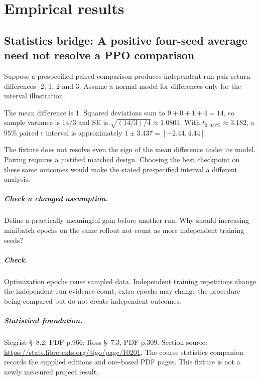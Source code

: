 \documentclass[11pt,oneside]{scrbook}
\begin{document}
\chapter{Empirical results}

\section{Statistics bridge: A positive four-seed average need not resolve a PPO comparison}
\begin{example}
Suppose a prespecified paired comparison produces independent run-pair return differences -2, 1, 2 and 3. Assume a normal model for differences only for the interval illustration.

The mean difference is 1. Squared deviations sum to $9+0+1+4=14$, so sample variance is $14/3$ and SE is $\sqrt{(14/3)/4}\approx1.0801$. With $t_{3,0.975}\approx3.182$, a 95\% paired t interval is approximately $1\pm3.437=[-2.44,4.44]$.
\end{example}
The fixture does not resolve even the sign of the mean difference under its model. Pairing requires a justified matched design. Choosing the best checkpoint on these same outcomes would make the stated prespecified interval a different analysis.

\paragraph{Check a changed assumption.} Define a practically meaningful gain before another run. Why should increasing minibatch epochs on the same rollout not count as more independent training seeds?
\paragraph{Check.} Optimization epochs reuse sampled data. Independent training repetitions change the independent-run evidence count; extra epochs may change the procedure being compared but do not create independent outcomes.
\paragraph{Statistical foundation.} Siegrist \S~8.2, PDF p.966; Ross \S~7.3, PDF p.309. Section source: \url{https://stats.libretexts.org/@go/page/10201}. The course statistics companion records the supplied editions and one-based PDF pages. This fixture is not a newly measured project result.
\end{document}
